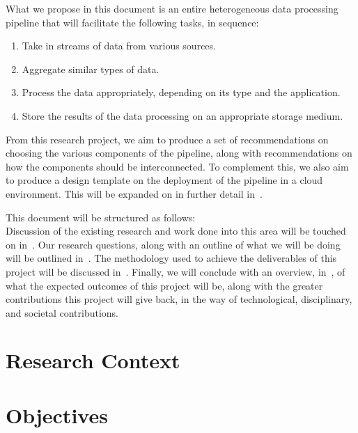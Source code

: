 \documentclass[a4paper,11pt]{article}
\begin{document}
What we propose in this document is an entire heterogeneous data processing pipeline that will facilitate the following
tasks, in sequence:

\begin{enumerate}
  \item Take in streams of data from various sources.
  \item Aggregate similar types of data.
  \item Process the data appropriately, depending on its type and the application.
  \item Store the results of the data processing on an appropriate storage medium.
\end{enumerate}

From this research project, we aim to produce a set of recommendations on choosing the various components of the
pipeline, along with recommendations on how the components should be interconnected. To complement this, we also aim to produce a design template on the
deployment of the pipeline in a cloud environment. This will be expanded on in further detail
in~.

This document will be structured as follows:\\
Discussion of the existing research and work done into this area will be
touched on in~. Our research questions, along with an outline of what we will be doing
will be outlined in~. The methodology used to achieve the deliverables of this project will be
discussed in~. Finally, we will conclude with an overview, in~,
of what the expected outcomes of this project will be, along with the greater contributions this project will give back,
in the way of technological, disciplinary, and societal contributions.




\section{Research Context} %
\label{sec:research_context}






\section{Objectives} %
\label{sec:objectives}
\end{document}
